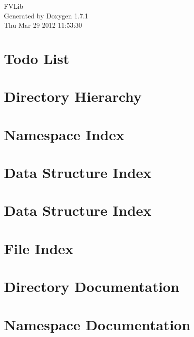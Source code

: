 \documentclass[a4paper]{book}
\begin{document}
\hypersetup{pageanchor=false}
\begin{titlepage}
\vspace*{7cm}
\begin{center}
{\Large FVLib }\\
\vspace*{1cm}
{\large Generated by Doxygen 1.7.1}\\
\vspace*{0.5cm}
{\small Thu Mar 29 2012 11:53:30}\\
\end{center}
\end{titlepage}
\clearemptydoublepage
{}
\tableofcontents
\clearemptydoublepage
{}
\hypersetup{pageanchor=true}
\chapter{Todo List}
\label{todo}
\hypertarget{todo}{}

\chapter{Directory Hierarchy}

\chapter{Namespace Index}

\chapter{Data Structure Index}

\chapter{Data Structure Index}

\chapter{File Index}

\chapter{Directory Documentation}



\chapter{Namespace Documentation}

\end{document}
